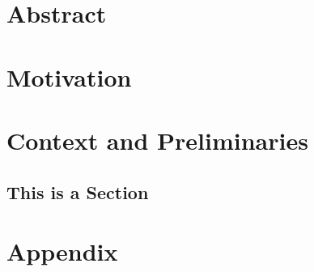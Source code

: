 \documentclass[
	11pt, 
	a4paper, 
	twoside, 
	openright, 
	titlepage=firstiscover, 
	numbers=noenddot, 
	BCOR=12mm,
	headsepline,
	footsepline,
	toc=listof,
	toc=bibliography
	]{scrbook}
\begin{document}

	
	
	
	
\cleardoublepage
{}
	
	\chapter*{Abstract}
	\Blindtext[2][2]
	
	\tableofcontents

\cleardoublepage
{} 

	\chapter{Motivation}
	\Blindtext[2][2]
	
	\chapter{Context and Preliminaries}
	\Blindtext[2][2]\cite{al-kodmany_sentient_2012}
	\section{This is a Section}
	\Blindtext[2][2]
	
	
\cleardoublepage
{}
	
	\appendix
	
	\chapter{Appendix}
	\Blindtext[2][2]
	
	
	
	
	\renewcommand{\listtheoremname}{List of Definitions}
	\listoftheorems[ignoreall,show={definition}]
	\listoffigures
	\listoftables
	\renewcommand{\lstlistlistingname}{List of \lstlistingname s}
	\lstlistoflistings	
	\renewcommand{\listtheoremname}{List of Formulas}
	\listoftheorems[ignoreall,show={formula}]
	\printbibliography %
\end{document}
